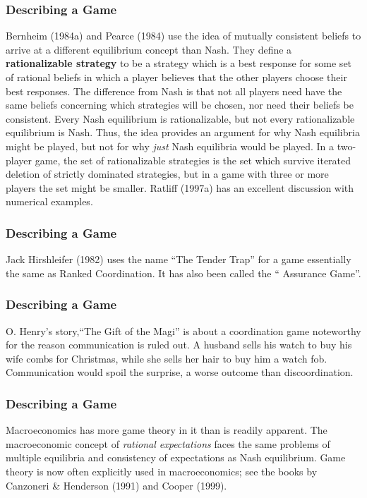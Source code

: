  \begin{frame}[fragile]\frametitle{Describing a Game}
 
 Bernheim (1984a) and Pearce (1984) use the idea of mutually consistent
beliefs to arrive at a different equilibrium concept than Nash. They define a
{\bf rationalizable strategy} to be a strategy which is a best response for some
set of rational beliefs in which a player believes that the other players choose
their best responses.     The difference from Nash is that not all players need
have the same beliefs concerning which strategies will be chosen, nor need their
beliefs be consistent. Every Nash equilibrium is rationalizable, but not every
rationalizable equilibrium is Nash. Thus, the idea provides an argument for  why
Nash equilibria might be played, but not for why {\it just} Nash equilibria
would be played. In a two-player game,  the  set of  rationalizable strategies
is  the set which   survive iterated deletion of strictly dominated strategies,
but in a game with three or more players the set might be smaller. Ratliff
(1997a) has an excellent discussion with numerical examples.
  

\end{frame}
 \begin{frame}[fragile]\frametitle{Describing a Game}

 Jack Hirshleifer (1982) uses the name  ``The {Tender Trap}''  for a game
essentially the same as {Ranked Coordination}.  It has also been called the  ``
{Assurance Game}''.

 \end{frame}
 \begin{frame}[fragile]\frametitle{Describing a Game}
 
  O. Henry's story,``The Gift of the Magi''  is about a coordination game
noteworthy for the reason  communication is ruled out. A husband sells his watch
to buy his wife combs for Christmas, while she sells her hair to buy him a watch
fob. Communication would spoil the surprise, a worse outcome than
discoordination.

              \end{frame}
 \begin{frame}[fragile]\frametitle{Describing a Game}
 
  Macroeconomics has more game theory in it than is readily
apparent. The macroeconomic concept of {\it rational expectations} faces the
same problems of multiple equilibria and consistency of expectations as Nash
equilibrium.  Game theory is now often explicitly used in macroeconomics; see
the books by Canzoneri \& Henderson (1991) and Cooper (1999).

\end{frame}
